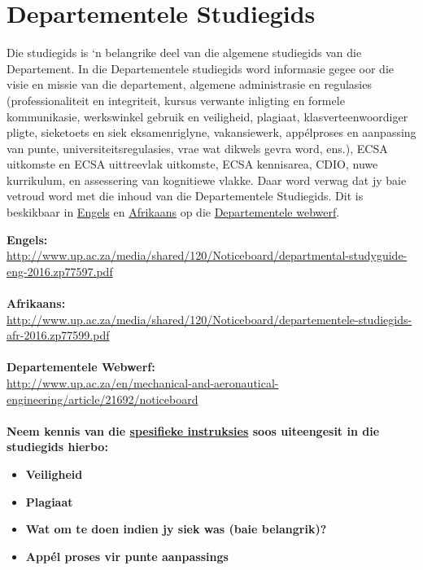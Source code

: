 \section{Departementele Studiegids}\label{sec:department}
    Die studiegids is `n belangrike deel van die algemene studiegids van die
    Departement. In die Departementele studiegids word informasie gegee oor die
    visie en missie van die departement, algemene administrasie en regulasies
    (professionaliteit en integriteit, kursus verwante inligting en formele
    kommunikasie, werkswinkel gebruik en veiligheid, plagiaat,
    klasverteenwoordiger pligte, sieketoets en siek eksamenriglyne,
    vakansiewerk, app\'{e}lproses en aanpassing van punte,
    universiteitsregulasies, vrae wat dikwels gevra word, ens.), ECSA uitkomste
    en ECSA uittreevlak uitkomste, ECSA kennisarea, CDIO, nuwe kurrikulum, en
    assessering van kognitiewe vlakke.  Daar word verwag dat jy baie vetroud
    word met die inhoud van die Departementele Studiegids. Dit is beskikbaar in
    \href{http://www.up.ac.za/media/shared/120/Noticeboard/departmental-studyguide-eng-2016.zp77597.pdf}{Engels}
    en
    \href{http://www.up.ac.za/media/shared/120/Noticeboard/departementele-studiegids-afr-2016.zp77599.pdf}{Afrikaans}
    op die
    \href{http://www.up.ac.za/en/mechanical-and-aeronautical-engineering/article/21692/noticeboard}{Departementele webwerf}.

    \noindent
    \textbf{Engels:} \\
    \url{http://www.up.ac.za/media/shared/120/Noticeboard/departmental-studyguide-eng-2016.zp77597.pdf} \\~\\
    \textbf{Afrikaans:} \\
    \url{http://www.up.ac.za/media/shared/120/Noticeboard/departementele-studiegids-afr-2016.zp77599.pdf} \\~\\
    \textbf{Departementele Webwerf:} \\
    \url{http://www.up.ac.za/en/mechanical-and-aeronautical-engineering/article/21692/noticeboard} \\~\\

    \noindent
    \textbf{Neem kennis van die \uline{spesifieke instruksies} soos uiteengesit
    in die studiegids hierbo:}
    \begin{itemize}
        \item \textbf{Veiligheid}
        \item \textbf{Plagiaat}
        \item \textbf{Wat om te doen indien jy siek was (baie belangrik)?}
        \item \textbf{App\'el proses vir punte aanpassings}
    \end{itemize}

